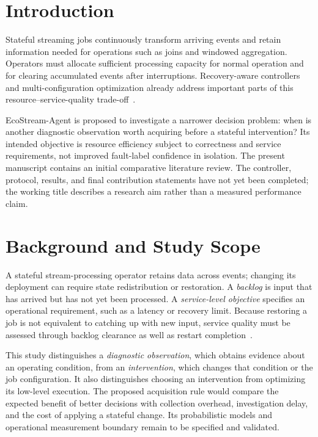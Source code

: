 \documentclass[nolineno]{ieeeaccess}
\begin{document}
\section{Introduction}
\label{sec:introduction}
Stateful streaming jobs continuously transform arriving events and retain information needed for operations such as joins and windowed aggregation. Operators must allocate sufficient processing capacity for normal operation and for clearing accumulated events after interruptions. Recovery-aware controllers and multi-configuration optimization already address important parts of this resource--service-quality trade-off~\cite{geldenhuys2022phoebe,geldenhuys2024demeter}.

EcoStream-Agent is proposed to investigate a narrower decision problem: when is another diagnostic observation worth acquiring before a stateful intervention? Its intended objective is resource efficiency subject to correctness and service requirements, not improved fault-label confidence in isolation. The present manuscript contains an initial comparative literature review. The controller, protocol, results, and final contribution statements have not yet been completed; the working title describes a research aim rather than a measured performance claim.

\section{Background and Study Scope}
\label{sec:background}
A stateful stream-processing operator retains data across events; changing its deployment can require state redistribution or restoration. A \emph{backlog} is input that has arrived but has not yet been processed. A \emph{service-level objective} specifies an operational requirement, such as a latency or recovery limit. Because restoring a job is not equivalent to catching up with new input, service quality must be assessed through backlog clearance as well as restart completion~\cite{geldenhuys2022phoebe}.

This study distinguishes a \emph{diagnostic observation}, which obtains evidence about an operating condition, from an \emph{intervention}, which changes that condition or the job configuration. It also distinguishes choosing an intervention from optimizing its low-level execution. The proposed acquisition rule would compare the expected benefit of better decisions with collection overhead, investigation delay, and the cost of applying a stateful change. Its probabilistic models and operational measurement boundary remain to be specified and validated.
\end{document}
